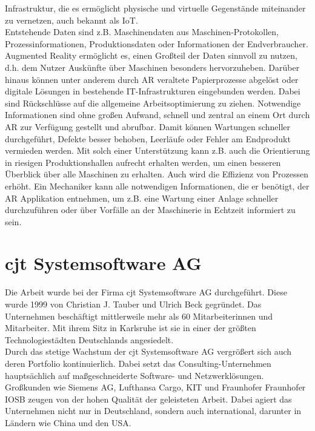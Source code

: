 Infrastruktur, die es ermöglicht physische und virtuelle Gegenstände miteinander zu vernetzen, auch bekannt als \ac{IoT}.
\\ 
Entstehende Daten sind z.B. Maschinendaten aus Maschinen-Protokollen, Prozessinformationen, Produktionsdaten oder 
Informationen der Endverbraucher. \cite{industrie40.2019f} Augmented Reality ermöglicht es, einen Großteil der Daten sinnvoll zu nutzen, d.h. 
dem Nutzer Auskünfte über Maschinen besonders hervorzuheben. Darüber hinaus können unter anderem durch \acs{AR} veraltete Papierprozesse 
abgelöst oder digitale Lösungen in bestehende IT-Infrastrukturen eingebunden werden. \cite{industrie40ar.2019n} 
Dabei sind Rückschlüsse auf die allgemeine Arbeitsoptimierung zu ziehen. Notwendige Informationen sind ohne 
großen Aufwand, schnell und zentral an einem Ort durch \acs{AR} zur Verfügung gestellt und abrufbar. Damit können 
Wartungen schneller durchgeführt, Defekte besser behoben, Leerläufe oder Fehler am Endprodukt vermieden werden. Mit solch einer Unterstützung 
kann z.B. auch die Orientierung in riesigen Produktionshallen aufrecht erhalten werden, um einen besseren Überblick über alle Maschinen 
zu erhalten. Auch wird die Effizienz von Prozessen erhöht. Ein Mechaniker kann alle notwendigen Informationen, die er benötigt, der 
\acl{AR} Applikation entnehmen, um z.B. eine Wartung einer Anlage schneller durchzuführen oder über Vorfälle an der Maschinerie in Echtzeit 
informiert zu sein. 
\section{cjt Systemsoftware AG}
\label{chap:cjt}
Die Arbeit wurde bei der Firma cjt Systemsoftware AG durchgeführt. Diese wurde
1999 von Christian J. Tauber und Ulrich Beck gegründet. Das Unternehmen beschäftigt mittlerweile mehr als 60 Mitarbeiterinnen und Mitarbeiter.
Mit ihrem Sitz in Karlsruhe ist sie in einer der größten Technologiestädten Deutschlands angesiedelt.
\\
\linebreak
Durch das stetige Wachstum der cjt Systemsoftware AG vergrößert sich auch deren
Portfolio kontinuierlich. Dabei setzt das Consulting-Unternehmen hauptsächlich auf maßgeschneiderte
Software- und Netzwerklösungen. Großkunden wie Siemens AG, Lufthansa Cargo,
\ac{KIT} und Fraunhofer \acs{Fraunhofer IOSB} zeugen von der hohen Qualität der geleisteten Arbeit. 
Dabei agiert das Unternehmen nicht nur in Deutschland, sondern auch international, darunter in Ländern wie China und den USA.
